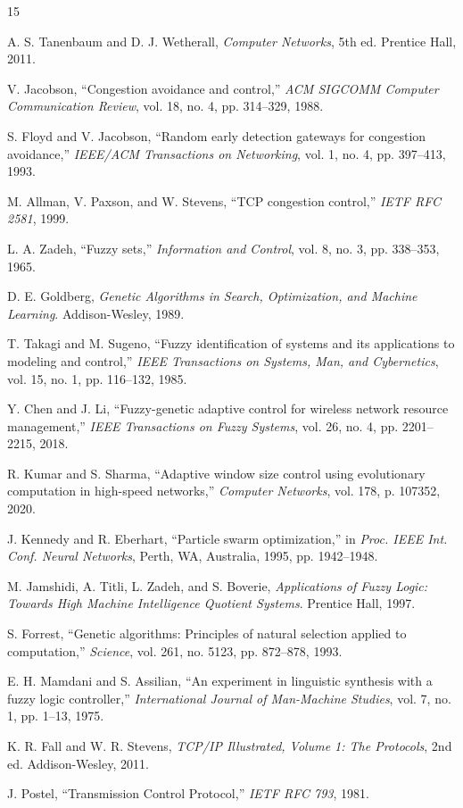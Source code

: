 \documentclass[10pt, twocolumn]{IEEEtran}
\theoremstyle{definition}
\begin{document}
\begin{thebibliography}{15}

A. S. Tanenbaum and D. J. Wetherall,
\textit{Computer Networks}, 5th ed.
Prentice Hall, 2011.

V. Jacobson,
``Congestion avoidance and control,''
\textit{ACM SIGCOMM Computer Communication Review}, vol. 18, no. 4, pp. 314--329, 1988.

S. Floyd and V. Jacobson,
``Random early detection gateways for congestion avoidance,''
\textit{IEEE/ACM Transactions on Networking}, vol. 1, no. 4, pp. 397--413, 1993.

M. Allman, V. Paxson, and W. Stevens,
``TCP congestion control,''
\textit{IETF RFC 2581}, 1999.

L. A. Zadeh,
``Fuzzy sets,''
\textit{Information and Control}, vol. 8, no. 3, pp. 338--353, 1965.

D. E. Goldberg,
\textit{Genetic Algorithms in Search, Optimization, and Machine Learning}.
Addison-Wesley, 1989.

T. Takagi and M. Sugeno,
``Fuzzy identification of systems and its applications to modeling and control,''
\textit{IEEE Transactions on Systems, Man, and Cybernetics}, vol. 15, no. 1, pp. 116--132, 1985.

Y. Chen and J. Li,
``Fuzzy-genetic adaptive control for wireless network resource management,''
\textit{IEEE Transactions on Fuzzy Systems}, vol. 26, no. 4, pp. 2201--2215, 2018.

R. Kumar and S. Sharma,
``Adaptive window size control using evolutionary computation in high-speed networks,''
\textit{Computer Networks}, vol. 178, p. 107352, 2020.

J. Kennedy and R. Eberhart,
``Particle swarm optimization,''
in \textit{Proc. IEEE Int. Conf. Neural Networks}, Perth, WA, Australia, 1995, pp. 1942--1948.

M. Jamshidi, A. Titli, L. Zadeh, and S. Boverie,
\textit{Applications of Fuzzy Logic: Towards High Machine Intelligence Quotient Systems}.
Prentice Hall, 1997.

S. Forrest,
``Genetic algorithms: Principles of natural selection applied to computation,''
\textit{Science}, vol. 261, no. 5123, pp. 872--878, 1993.

E. H. Mamdani and S. Assilian,
``An experiment in linguistic synthesis with a fuzzy logic controller,''
\textit{International Journal of Man-Machine Studies}, vol. 7, no. 1, pp. 1--13, 1975.

K. R. Fall and W. R. Stevens,
\textit{TCP/IP Illustrated, Volume 1: The Protocols}, 2nd ed.
Addison-Wesley, 2011.

J. Postel,
``Transmission Control Protocol,''
\textit{IETF RFC 793}, 1981.

\end{thebibliography}
\end{document}
